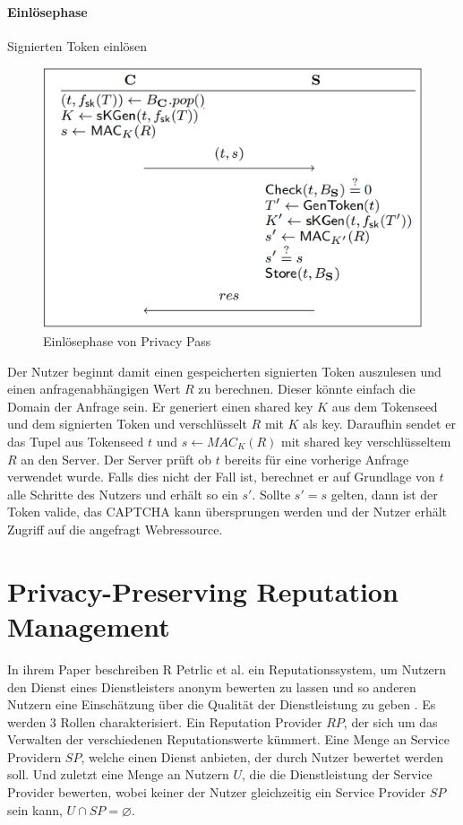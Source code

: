\documentclass[11pt,a4paper]{scrreprt}
\begin{document}
\paragraph{Einlösephase} Signierten Token einlösen\\
\begin{figure}[H]
    \centering
    \includegraphics[width=0.5\linewidth]{pp-redemptionphase.png} 
    \caption{Einlösephase von Privacy Pass \cite{pp-davidson2018privacy}}
    \label{fig:pp-redemptoinphase}
\end{figure}
Der Nutzer beginnt damit einen gespeicherten signierten Token auszulesen und einen anfragenabhängigen Wert $R$ zu berechnen. Dieser könnte einfach die Domain der Anfrage sein. Er generiert einen shared key $K$ aus dem Tokenseed und dem signierten Token und verschlüsselt $R$ mit $K$ als key. Daraufhin sendet er das Tupel aus Tokenseed $t$ und $s\leftarrow MAC_{K}(R)$ mit shared key verschlüsseltem $R$ an den Server. Der Server prüft ob $t$ bereits für eine vorherige Anfrage verwendet wurde. Falls dies nicht der Fall ist, berechnet er auf Grundlage von $t$ alle Schritte des Nutzers und erhält so ein $s'$. Sollte $s' =s$ gelten, dann ist der Token valide, das CAPTCHA kann übersprungen werden und der Nutzer erhält Zugriff auf die angefragt Webressource.


\section{Privacy-Preserving Reputation Management}
\label{subsec:rep}
In ihrem Paper beschreiben R Petrlic et al. ein Reputationssystem, um Nutzern den Dienst eines Dienstleisters anonym bewerten zu lassen und so anderen Nutzern eine Einschätzung über die Qualität der Dienstleistung zu geben \cite{petrlic2014privacy}. Es werden 3 Rollen charakterisiert. Ein Reputation Provider $RP$, der sich um das Verwalten der verschiedenen Reputationswerte kümmert. Eine Menge an Service Providern $SP$, welche einen Dienst anbieten, der durch Nutzer bewertet werden soll. Und zuletzt eine Menge an Nutzern $U$, die die Dienstleistung der Service Provider bewerten, wobei keiner der Nutzer gleichzeitig ein Service Provider $SP$ sein kann, $U \cap SP = \varnothing$. 
\end{document}
